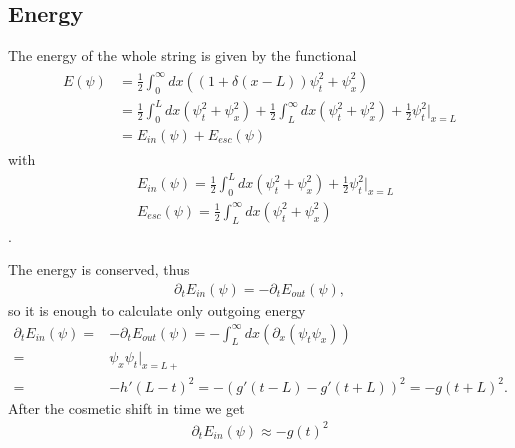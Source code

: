 \documentclass[
a4paper,%
10pt,%
titlepage,%
twoside%
]{article}
\begin{document}



\subsection{Energy}
The energy of the whole string is given by the functional
\begin{align}
  \begin{split}
    E(\psi)&=\frac{1}{2}\int_0^\infty dx ((1+\delta(x-L))\psi_t^2+\psi_x^2)\\
    &=\frac{1}{2}\int_0^L dx(\psi_t^2+\psi_x^2)+\frac{1}{2}\int_L^\infty dx(\psi_t^2+\psi_x^2)+\frac{1}{2}\psi_t^2\bigg|_{x=L}\\
    &=E_{in}(\psi)+E_{esc}(\psi)
  \end{split}
\end{align}
with
\begin{align}
  &E_{in}(\psi)=\frac{1}{2}\int_0^L dx(\psi_t^2+\psi_x^2)+\frac{1}{2}\psi_t^2\bigg|_{x=L}\\
  &E_{esc}(\psi)=\frac{1}{2}\int_L^\infty dx(\psi_t^2+\psi_x^2)
\end{align}.

The energy is conserved, thus
\begin{align}
  \partial_t E_{in}(\psi)=-\partial_t E_{out}(\psi),
\end{align}
so it is enough to calculate only outgoing energy
\begin{align}
  \partial_t E_{in}(\psi)=&-\partial_t E_{out}(\psi)=-\int_L^\infty dx(\partial_x(\psi_t\psi_x))\\
  =&\psi_x\psi_t\big|_{x=L+}\\
  =&-h'(L-t)^2=-(g'(t-L)-g'(t+L))^2=-g(t+L)^2.
\end{align}
After the cosmetic shift in time we get
\begin{align}
  \partial_t E_{in}(\psi)\approx -g(t)^2
\end{align}
\end{document}
